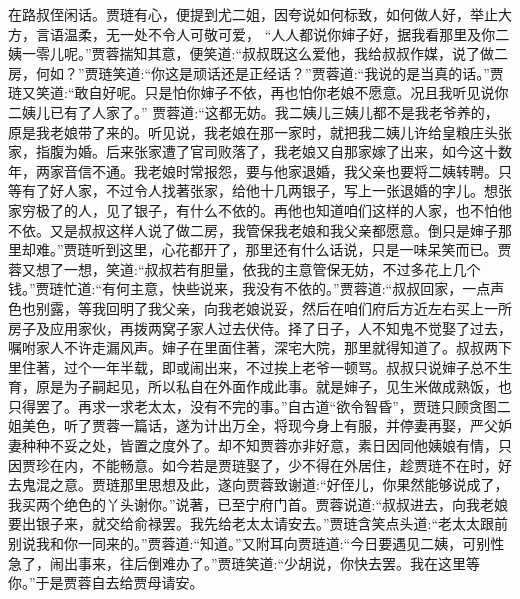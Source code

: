 \begin{parag}
    在路叔侄闲话。贾琏有心，便提到尤二姐，因夸说如何标致，如何做人好，举止大方，言语温柔，无一处不令人可敬可爱， “人人都说你婶子好，据我看那里及你二姨一零儿呢。”贾蓉揣知其意，便笑道:“叔叔既这么爱他，我给叔叔作媒，说了做二房，何如？”贾琏笑道:“你这是顽话还是正经话？”贾蓉道:“我说的是当真的话。”贾琏又笑道:“敢自好呢。只是怕你婶子不依，再也怕你老娘不愿意。况且我听见说你二姨儿已有了人家了。” 贾蓉道:“这都无妨。我二姨儿三姨儿都不是我老爷养的，原是我老娘带了来的。听见说，我老娘在那一家时，就把我二姨儿许给皇粮庄头张家，指腹为婚。后来张家遭了官司败落了，我老娘又自那家嫁了出来，如今这十数年，两家音信不通。我老娘时常报怨，要与他家退婚，我父亲也要将二姨转聘。只等有了好人家，不过令人找著张家，给他十几两银子，写上一张退婚的字儿。想张家穷极了的人，见了银子，有什么不依的。再他也知道咱们这样的人家，也不怕他不依。又是叔叔这样人说了做二房，我管保我老娘和我父亲都愿意。倒只是婶子那里却难。”贾琏听到这里，心花都开了，那里还有什么话说，只是一味呆笑而已。贾蓉又想了一想，笑道:“叔叔若有胆量，依我的主意管保无妨，不过多花上几个钱。”贾琏忙道:“有何主意，快些说来，我没有不依的。”贾蓉道:“叔叔回家，一点声色也别露，等我回明了我父亲，向我老娘说妥，然后在咱们府后方近左右买上一所房子及应用家伙，再拨两窝子家人过去伏侍。择了日子，人不知鬼不觉娶了过去，嘱咐家人不许走漏风声。婶子在里面住著，深宅大院，那里就得知道了。叔叔两下里住著，过个一年半载，即或闹出来，不过挨上老爷一顿骂。叔叔只说婶子总不生育，原是为子嗣起见，所以私自在外面作成此事。就是婶子，见生米做成熟饭，也只得罢了。再求一求老太太，没有不完的事。”自古道“欲令智昏”，贾琏只顾贪图二姐美色，听了贾蓉一篇话，遂为计出万全，将现今身上有服，并停妻再娶，严父妒妻种种不妥之处，皆置之度外了。却不知贾蓉亦非好意，素日因同他姨娘有情，只因贾珍在内，不能畅意。如今若是贾琏娶了，少不得在外居住，趁贾琏不在时，好去鬼混之意。贾琏那里思想及此，遂向贾蓉致谢道:“好侄儿，你果然能够说成了，我买两个绝色的丫头谢你。”说著，已至宁府门首。贾蓉说道:“叔叔进去，向我老娘要出银子来，就交给俞禄罢。我先给老太太请安去。”贾琏含笑点头道:“老太太跟前别说我和你一同来的。”贾蓉道:“知道。”又附耳向贾琏道:“今日要遇见二姨，可别性急了，闹出事来，往后倒难办了。”贾琏笑道:“少胡说，你快去罢。我在这里等你。”于是贾蓉自去给贾母请安。
\end{parag}


